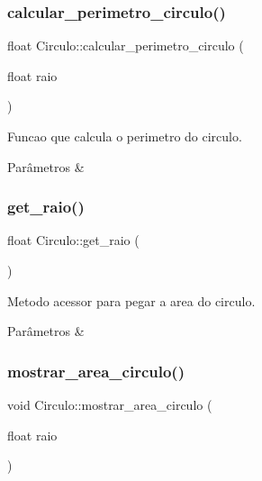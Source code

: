 \subsubsection{\texorpdfstring{calcular\+\_\+perimetro\+\_\+circulo()}{calcular\_perimetro\_circulo()}}
{\footnotesize\ttfamily float Circulo\+::calcular\+\_\+perimetro\+\_\+circulo (\begin{DoxyParamCaption}\item[{float}]{raio }\end{DoxyParamCaption})}



Funcao que calcula o perimetro do circulo. 


\begin{DoxyParams}{Parâmetros}
{\em } & \\
\hline
\end{DoxyParams}
\mbox{\label{classCirculo_a3e15806c8d2eeba9363ebca894bf9b8c}} 
\subsubsection{\texorpdfstring{get\+\_\+raio()}{get\_raio()}}
{\footnotesize\ttfamily float Circulo\+::get\+\_\+raio (\begin{DoxyParamCaption}{ }\end{DoxyParamCaption})}



Metodo acessor para pegar a area do circulo. 


\begin{DoxyParams}{Parâmetros}
{\em } & \\
\hline
\end{DoxyParams}
\mbox{\label{classCirculo_a2ed2db29db9ed4e1888c3c2546a80dbe}} 
\subsubsection{\texorpdfstring{mostrar\+\_\+area\+\_\+circulo()}{mostrar\_area\_circulo()}}
{\footnotesize\ttfamily void Circulo\+::mostrar\+\_\+area\+\_\+circulo (\begin{DoxyParamCaption}\item[{float}]{raio }\end{DoxyParamCaption})}



